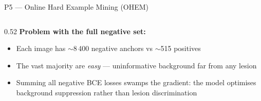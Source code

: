 \documentclass[aspectratio=169, 10pt]{beamer}
\begin{document}
\begin{frame}{P5 — Online Hard Example Mining (OHEM)}
  \begin{columns}[T]
    \begin{column}{0.52\textwidth}
      \textbf{Problem with the full negative set:}
      \begin{itemize}\small
        \item Each image has $\sim$8\,400 negative anchors vs $\sim$5\text{--}15 positives
        \item The vast majority are \emph{easy} — uninformative background far from any lesion
        \item Summing all negative BCE losses swamps the gradient: the model optimises
              background suppression rather than lesion discrimination
      \end{itemize}


\end{column}
\end{columns}
\end{frame}
\end{document}
